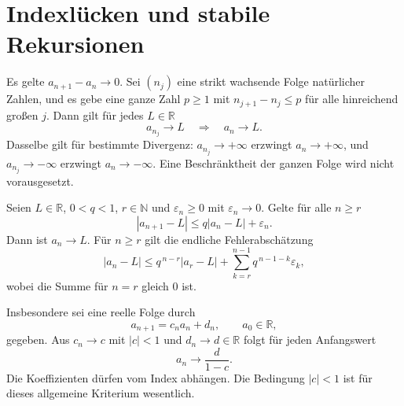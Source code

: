 \clearpage
\section{Indexlücken und stabile Rekursionen}

\begin{theorem}
\label{b21guide:thm:bounded-gaps}
Es gelte $a_{n+1}-a_n\to0$.
Sei $(n_j)$ eine strikt wachsende Folge natürlicher Zahlen, und
es gebe eine ganze Zahl $p\geq1$ mit
$n_{j+1}-n_j\leq p$ für alle hinreichend großen $j$.
Dann gilt für jedes $L\in\mathbb R$
\[
 a_{n_j}\to L\quad\Longrightarrow\quad a_n\to L.
\]
Dasselbe gilt für bestimmte Divergenz:
$a_{n_j}\to+\infty$ erzwingt $a_n\to+\infty$,
und $a_{n_j}\to-\infty$ erzwingt $a_n\to-\infty$.
Eine Beschränktheit der ganzen Folge wird nicht vorausgesetzt.
\end{theorem}

\begin{theorem}
\label{b21guide:thm:perturbed-recursion}
Seien $L\in\mathbb R$, $0<q<1$, $r\in\mathbb N$ und
$\varepsilon_n\geq0$ mit $\varepsilon_n\to0$.
Gelte für alle $n\geq r$
\[
 |a_{n+1}-L|\leq q|a_n-L|+\varepsilon_n.
\]
Dann ist $a_n\to L$. Für $n\geq r$ gilt die endliche Fehlerabschätzung
\[
 |a_n-L|
 \leq q^{\,n-r}|a_r-L|
       +\sum_{k=r}^{n-1}q^{\,n-1-k}\varepsilon_k,
\]
wobei die Summe für $n=r$ gleich $0$ ist.

Insbesondere sei eine reelle Folge durch
\[
 a_{n+1}=c_na_n+d_n,\qquad a_0\in\mathbb R,
\]
gegeben. Aus $c_n\to c$ mit $|c|<1$ und $d_n\to d\in\mathbb R$
folgt für jeden Anfangswert
\[
 a_n\longrightarrow\frac{d}{1-c}.
\]
Die Koeffizienten dürfen vom Index abhängen.
Die Bedingung $|c|<1$ ist für dieses allgemeine Kriterium wesentlich.
\end{theorem}
